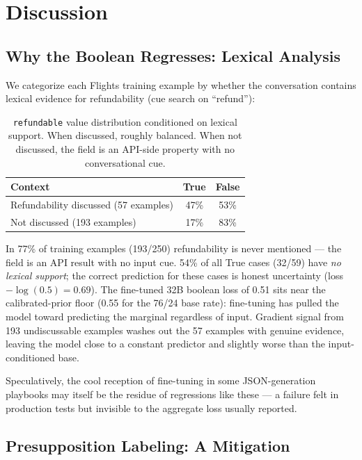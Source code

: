 \documentclass{article}
\begin{document}
\section{Discussion}

\subsection{Why the Boolean Regresses: Lexical Analysis}

We categorize each Flights training example by whether the conversation contains lexical evidence for refundability (cue search on ``refund''):

\begin{table}[h]
\centering
\small
\begin{tabular}{lcc}
\toprule
\textbf{Context} & \textbf{True} & \textbf{False} \\
\midrule
Refundability discussed (57 examples) & 47\% & 53\% \\
Not discussed (193 examples) & 17\% & 83\% \\
\bottomrule
\end{tabular}
\caption{\texttt{refundable} value distribution conditioned on lexical support. When discussed, roughly balanced. When not discussed, the field is an API-side property with no conversational cue.}
\label{tab:lexical}
\end{table}

In 77\% of training examples (193/250) refundability is never mentioned --- the field is an API result with no input cue. 54\% of all True cases (32/59) have \emph{no lexical support}; the correct prediction for these cases is honest uncertainty (loss $-\log(0.5)=0.69$). The fine-tuned 32B boolean loss of 0.51 sits near the calibrated-prior floor (0.55 for the 76/24 base rate): fine-tuning has pulled the model toward predicting the marginal regardless of input. Gradient signal from 193 undiscussable examples washes out the 57 examples with genuine evidence, leaving the model close to a constant predictor and slightly worse than the input-conditioned base.

Speculatively, the cool reception of fine-tuning in some JSON-generation playbooks may itself be the residue of regressions like these — a failure felt in production tests but invisible to the aggregate loss usually reported.

\subsection{Presupposition Labeling: A Mitigation}\label{sec:pcl}
\end{document}
